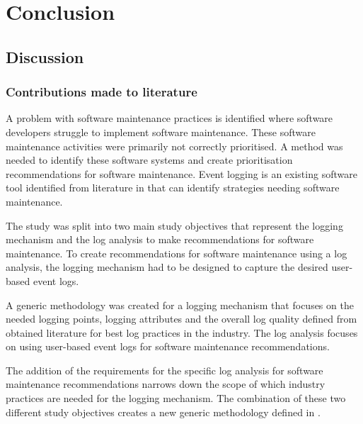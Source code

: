 \chapter{Conclusion}
\label{chap:4}

\section{Discussion}

\subsection{Contributions made to literature}
A problem with software maintenance practices is identified where software developers struggle to implement software maintenance. These software maintenance activities were primarily not correctly prioritised. A method was needed to identify these software systems and create prioritisation recommendations for software maintenance. Event logging is an existing software tool identified from literature in  that can identify strategies needing software maintenance. \par The study was split into two main study objectives that represent the logging mechanism and the log analysis to make recommendations for software maintenance. To create recommendations for software maintenance using a log analysis, the logging mechanism had to be designed to capture the desired user-based event logs. \par A generic methodology was created for a logging mechanism that focuses on the needed logging points, logging attributes and the overall log quality defined from obtained literature for best log practices in the industry. The log analysis focuses on using user-based event logs for software maintenance recommendations.\par The addition of the requirements for the specific log analysis for software maintenance recommendations narrows down the scope of which industry practices are needed for the logging mechanism. The combination of these two different study objectives creates a new generic methodology defined in .

